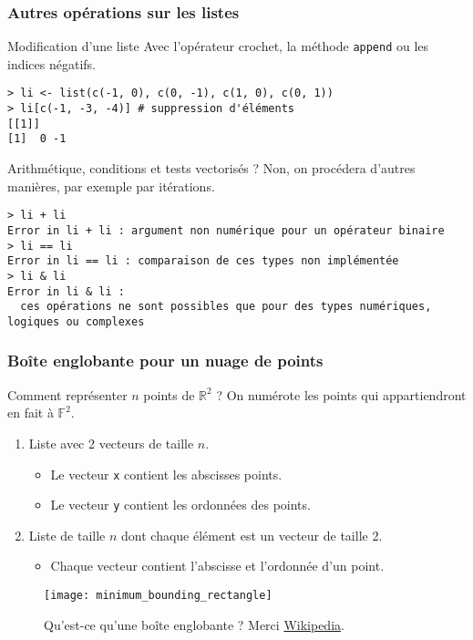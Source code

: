 \documentclass[10pt]{beamer}
\begin{document}
\begin{frame}[fragile]
  \frametitle{Autres opérations sur les listes}
  
  \begin{block}{Modification d'une liste}
    Avec l'opérateur crochet, la méthode \texttt{append} ou les indices négatifs.
  \begin{lstlisting}[style=block]
> li <- list(c(-1, 0), c(0, -1), c(1, 0), c(0, 1)) 
> li[c(-1, -3, -4)] # suppression d'éléments
[[1]]
[1]  0 -1
\end{lstlisting}  
\end{block}


  \begin{block}{Arithmétique, conditions et tests vectorisés ? }
    Non, on procédera d'autres manières, par exemple par itérations.
    \begin{lstlisting}
> li + li
Error in li + li : argument non numérique pour un opérateur binaire    
> li == li 
Error in li == li : comparaison de ces types non implémentée
> li & li
Error in li & li : 
  ces opérations ne sont possibles que pour des types numériques, logiques ou complexes
\end{lstlisting}

\end{block}

\end{frame}



\begin{frame}[fragile]
  \frametitle{Boîte englobante pour un nuage de points}
    \begin{block}{Comment représenter $n$ points de $\mathbb{R}^2$ ?}
      On numérote les points qui appartiendront en fait à $\mathbb{F}^2$.
      \begin{enumerate}
    \item Liste avec 2 vecteurs de taille $n$. 
      \begin{itemize}
      \item Le vecteur \texttt{x} contient les abscisses points.
      \item Le vecteur \texttt{y} contient les ordonnées des points.
      \end{itemize}
    \item Liste de taille $n$ dont chaque élément est un vecteur de taille 2.
      \begin{itemize}
      \item Chaque vecteur contient l'abscisse et l'ordonnée d'un point.
      \end{itemize}
    \end{enumerate}
  \end{block}

  \begin{figure}[htbp]
    \centering
    \texttt{[image: minimum\_bounding\_rectangle]}
    \caption{Qu'est-ce qu'une boîte englobante ? Merci \href{https://en.wikipedia.org/wiki/Minimum_bounding_box}{Wikipedia}.}
  \end{figure}
\end{frame}
\end{document}
